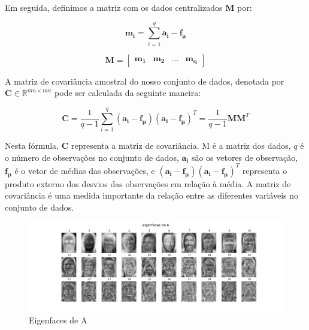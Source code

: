 \documentclass[12pt]{article}
\begin{document}
        Em seguida, definimos a matriz com os dados centralizados $\boldsymbol{M}$ por:

            $$
            \boldsymbol{m_i} = \sum_{i=1}^{q} \boldsymbol{a_i} - \boldsymbol{f_\mu}
            $$        

            $$
            \boldsymbol{M} = \begin{bmatrix} \boldsymbol{m_1} & \boldsymbol{m_2} & \ldots & \boldsymbol{m_q} \end{bmatrix}
            $$

            
           A matriz de covariância amostral do nosso conjunto de dados, denotada por $\boldsymbol{C} \in  \mathds{R}^{mn \times mn}$ pode ser calculada da seguinte maneira:

            $$
            \boldsymbol{C} 
            = \frac{1}{q-1} \sum_{i=1}^{q}  (\boldsymbol{a_i} - \boldsymbol{f_\mu}) (\boldsymbol{a_i} - \boldsymbol{f_\mu} )^{T}
            = \frac{1}{q-1} \boldsymbol{M} \boldsymbol{M}^T 
            $$
            
            Nesta fórmula, $\boldsymbol{C}$ representa a matriz de covariância. M é a matriz dos dados, $q$ é o número de observações no conjunto de dados, $\boldsymbol{a_i}$ são os vetores de observação, $\boldsymbol{f_\mu}$ é o vetor de médias das observações, e $(\boldsymbol{a_i} - \boldsymbol{f_\mu}) (\boldsymbol{a_i} - \boldsymbol{f_\mu})^T$ representa o produto externo dos desvios das observações em relação à média. A matriz de covariância é uma medida importante da relação entre as diferentes variáveis no conjunto de dados.

            \begin{figure}[H]
                  \centering
                  \includegraphics[width=1\textwidth]{img/EMAP_2.png}
                  \caption{Eigenfaces de A}
                  \label{fig:exemplo}
            \end{figure}
            
\end{document}
